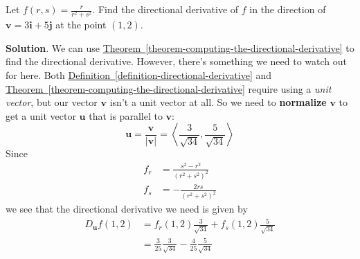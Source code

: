 \documentclass[10pt,]{book}
\newcommand{\terminology}[1]{\textbf{#1}}
\theoremstyle{ptxplainnotitle}
\theoremstyle{ptxplaintitle}
\theoremstyle{ptxplainnotitle}
\theoremstyle{ptxplaintitle}
\theoremstyle{ptxplainnotitle}
\theoremstyle{ptxplaintitle}
\theoremstyle{ptxdefinitionnotitle}
\theoremstyle{ptxdefinitiontitle}
\theoremstyle{ptxdefinitionnotitle}
\theoremstyle{ptxdefinitiontitle}
\theoremstyle{ptxdefinitionnotitle}
\theoremstyle{ptxdefinitiontitle}
\theoremstyle{ptxdefinitionnotitle}
\theoremstyle{ptxdefinitiontitle}
\theoremstyle{ptxdefinitionnotitle}
\theoremstyle{ptxdefinitiontitle}
\numberwithin{equation}{section}
\newcommand{\vv}[1]{\mathbf{#1}}
\newcommand{\dotprod}[1]{\left\langle #1 \right\rangle}
\begin{document}
\begin{example}\label{example-computing-a-directional-derivative}
\hypertarget{p-1059}{}%
Let \(f(r,s) = \frac{r}{r^{2}+s^{2}}\). Find the directional derivative of \(f\) in the direction of \(\vv{v} = 3\vv{i} + 5\vv{j}\) at the point \((1,2)\).%
\par\smallskip%
\noindent\textbf{Solution}.\hypertarget{solution-165}{}\quad%
\hypertarget{p-1060}{}%
We can use \hyperref[theorem-computing-the-directional-derivative]{Theorem~\ref{theorem-computing-the-directional-derivative}} to find the directional derivative. However, there's something we need to watch out for here. Both \hyperref[definition-directional-derivative]{Definition~\ref{definition-directional-derivative}} and \hyperref[theorem-computing-the-directional-derivative]{Theorem~\ref{theorem-computing-the-directional-derivative}} require using a \emph{unit vector}, but our vector \(\vv{v}\) isn't a unit vector at all. So we need to \terminology{normalize} \(\vv{v}\) to get a unit vector \(\vv{u}\) that is parallel to \(\vv{v}\):%
\begin{equation*}
\vv{u} = \frac{\vv{v}}{|\vv{v}|} = \dotprod{\frac{3}{\sqrt{34}}, \frac{5}{\sqrt{34}}}
\end{equation*}
Since%
\begin{align*}
f_{r} & = \frac{s^{2} - r^{2}}{(r^{2} + s^{2})^{2}} \\
f_{s} & = -\frac{2rs}{(r^{2} + s^{2})^{2}} 
\end{align*}
we see that the directional derivative we need is given by%
\begin{align*}
D_{\vv{u}}f(1,2) & = f_{r}(1,2)\frac{3}{\sqrt{34}} + f_{s}(1,2)\frac{5}{\sqrt{34}} \\
& = \frac{3}{25}\frac{3}{\sqrt{34}} - \frac{4}{25}\frac{5}{\sqrt{34}} 
\end{align*}
%
\end{example}
\typeout{************************************************}
\typeout{************************************************}
\end{document}
